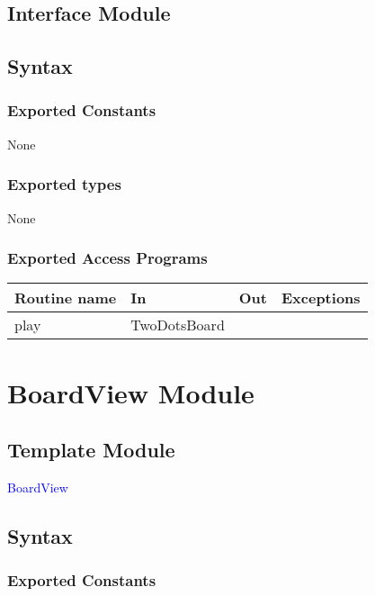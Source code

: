 \documentclass[12pt]{article}
\begin{document}
\subsection* {Interface Module}


\subsection* {Syntax}

\subsubsection* {Exported Constants}

None

\subsubsection* {Exported types}

None

\subsubsection* {Exported Access Programs}

\begin{tabular}{| l | l | l | p{6cm} |}
\hline
\textbf{Routine name} & \textbf{In} & \textbf{Out} & \textbf{Exceptions}\\
\hline
play & TwoDotsBoard & & \\
\hline
\end{tabular}

\newpage

\section* {BoardView Module}

\subsection* {Template Module}

\noindent \textcolor{blue}{BoardView}

\subsection* {Syntax}

\subsubsection* {Exported Constants}
\end{document}
